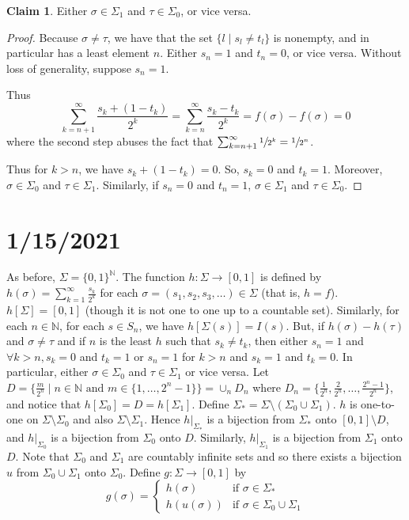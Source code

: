 \documentclass{article}
\newcommand{\N}{\mathbb{N}}
\theoremstyle{definition}
\newtheorem*{claim}{Claim}
\begin{document}
\begin{claim}
    Either $\sigma\in\Sigma_1$ and $\tau\in\Sigma_0$, or vice versa.
\end{claim}
\begin{proof}
Because $\sigma\neq\tau$, we have that the set $\{l\mid s_l\neq t_l\}$ is nonempty, and in particular has a least element $n$. Either $s_n = 1$ and $t_n = 0$, or vice versa. Without loss of generality, suppose $s_n = 1$.

Thus \[\sum_{k=n+1}^\infty \frac{s_k + (1-t_k)}{2^k} = \sum_{k=n}^\infty \frac{s_k - t_k}{2^k} = f(\sigma) -f(\sigma) = 0\] where the second step abuses the fact that $\sum_{k=n+1}^\infty \sfrac1{2^k} = \sfrac1{2^n}$.

Thus for $k > n$, we have $s_k + (1-t_k) = 0$. So, $s_k = 0$ and $t_k = 1$. Moreover, $\sigma \in \Sigma_0$ and $\tau \in \Sigma_1$. Similarly, if $s_n = 0$ and $t_n = 1$, $\sigma \in \Sigma_1$ and $\tau \in \Sigma_0$.
\end{proof}

\section*{1/15/2021}

As before, $\Sigma = \{0,1\}^{\N}$. The function $h:\Sigma \rightarrow [0,1]$ is defined by $h(\sigma) = \sum_{k=1}^\infty \frac{s_k}{2^k}$
for each $\sigma = (s_1, s_2, s_3, \dots) \in \Sigma$ (that is, $h = f$). $h[\Sigma] = [0,1]$ (though it is not one to one up to a countable set). 
Similarly, for each $n \in \N$, for each $s \in S_n$, we have $h[\Sigma(s)] = I(s)$. But, if $h(\sigma) - h(\tau)$ and $\sigma \neq \tau$ and if
$n$ is the least $h$ such that $s_k \neq t_k$, then either $s_n = 1$ and $\forall k > n, s_k = 0$ and $t_k = 1$ or $s_n = 1$ for $k > n$ and $s_k = 1$ and $t_k = 0$. 
In particular, either $\sigma \in \Sigma_0$ and $\tau \in \Sigma_1$ or vice versa.
Let $D = \{\frac{m}{2^n} \mid n \in \N \text{ and }m \in \{1,\dots, 2^n-1\}\} = \cup_n D_n$ where $D_n = \{\frac{1}{2^n}, \frac{2}{2^n}, \dots , \frac{2^n-1}{2^n}\}$, and notice that $h[\Sigma_0] = D = h[\Sigma_1]$.
Define $\Sigma_* = \Sigma \setminus (\Sigma_0 \cup \Sigma_1)$. $h$ is one-to-one on $\Sigma \setminus \Sigma_0$ and also $\Sigma \setminus \Sigma_1$.
Hence $h|_{\Sigma_*}$ is a bijection from $\Sigma_*$ onto $[0,1] \setminus D$, and $h|_{\Sigma_0}$ is a bijection from $\Sigma_0$ onto $D$. Similarly, $h|_{\Sigma_1}$ is a bijection from $\Sigma_1$ onto $D$. 
Note that $\Sigma_0$ and $\Sigma_1$ are countably infinite sets and so there exists a bijection $u$ from $\Sigma_0 \cup \Sigma_1$ onto $\Sigma_0$.
Define $g: \Sigma \rightarrow [0,1]$ by 
\[
    g(\sigma) = \begin{cases}
        h(\sigma) & \text{if } \sigma \in \Sigma_* \\
        h(u(\sigma)) & \text{if } \sigma \in \Sigma_0 \cup \Sigma_1
    \end{cases}
\]
\end{document}
